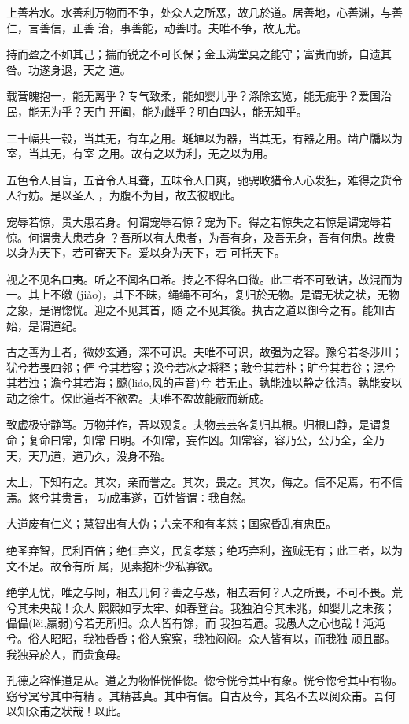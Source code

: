 \documentclass[a4paper, twoside, openany, extrafontsizes]{dlutthesis}
\begin{document}
上善若水。水善利万物而不争，处众人之所恶，故几於道。居善地，心善渊，与善仁，言善信，正善
治，事善能，动善时。夫唯不争，故无尤。

持而盈之不如其己；揣而锐之不可长保；金玉满堂莫之能守；富贵而骄，自遗其咎。功遂身退，天之
道。

载营魄抱一，能无离乎？专气致柔，能如婴儿乎？涤除玄览，能无疵乎？爱国治民，能无为乎？天门
开阖，能为雌乎？明白四达，能无知乎。

三十幅共一毂，当其无，有车之用。埏埴以为器，当其无，有器之用。凿户牖以为室，当其无，有室
之用。故有之以为利，无之以为用。

五色令人目盲，五音令人耳聋，五味令人口爽，驰骋畋猎令人心发狂，难得之货令人行妨。是以圣人
，为腹不为目，故去彼取此。

宠辱若惊，贵大患若身。何谓宠辱若惊？宠为下。得之若惊失之若惊是谓宠辱若惊。何谓贵大患若身
？吾所以有大患者，为吾有身，及吾无身，吾有何患。故贵以身为天下，若可寄天下。爱以身为天下，若
可托天下。

视之不见名曰夷。听之不闻名曰希。抟之不得名曰微。此三者不可致诘，故混而为一。其上不皦
(jiǎo)，其下不昧，绳绳不可名，复归於无物。是谓无状之状，无物之象，是谓惚恍。迎之不见其首，随
之不见其後。执古之道以御今之有。能知古始，是谓道纪。

古之善为士者，微妙玄通，深不可识。夫唯不可识，故强为之容。豫兮若冬涉川；犹兮若畏四邻；俨
兮其若容；涣兮若冰之将释；敦兮其若朴；旷兮其若谷；混兮其若浊；澹兮其若海；飉(liáo,风的声音)兮
若无止。孰能浊以静之徐清。孰能安以动之徐生。保此道者不欲盈。夫唯不盈故能蔽而新成。

致虚极守静笃。万物并作，吾以观复。夫物芸芸各复归其根。归根曰静，是谓复命；复命曰常，知常
曰明。不知常，妄作凶。知常容，容乃公，公乃全，全乃天，天乃道，道乃久，没身不殆。

太上，下知有之。其次，亲而誉之。其次，畏之。其次，侮之。信不足焉，有不信焉。悠兮其贵言，
功成事遂，百姓皆谓∶我自然。

大道废有仁义；慧智出有大伪；六亲不和有孝慈；国家昏乱有忠臣。

绝圣弃智，民利百倍；绝仁弃义，民复孝慈；绝巧弃利，盗贼无有；此三者，以为文不足。故令有所
属，见素抱朴少私寡欲。

绝学无忧，唯之与阿，相去几何？善之与恶，相去若何？人之所畏，不可不畏。荒兮其未央哉！众人
熙熙如享太牢、如春登台。我独泊兮其未兆，如婴儿之未孩；儡儡(lěi,羸弱)兮若无所归。众人皆有馀，而
我独若遗。我愚人之心也哉！沌沌兮。俗人昭昭，我独昏昏；俗人察察，我独闷闷。众人皆有以，而我独
顽且鄙。我独异於人，而贵食母。

孔德之容惟道是从。道之为物惟恍惟惚。惚兮恍兮其中有象。恍兮惚兮其中有物。窈兮冥兮其中有精
。其精甚真。其中有信。自古及今，其名不去以阅众甫。吾何以知众甫之状哉！以此。
\end{document}
